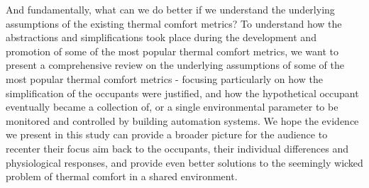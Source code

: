 And fundamentally, what can we do better if we understand the underlying assumptions of the existing thermal comfort metrics? To understand how the abstractions and simplifications took place during the development and promotion of some of the most popular thermal comfort metrics, we want to present a comprehensive review on the underlying assumptions of some of the most popular thermal comfort metrics - focusing particularly on how the simplification of the occupants were justified, and how the hypothetical occupant eventually became a collection of, or a single environmental parameter to be monitored and controlled by building automation systems. We hope the evidence we present in this study can provide a broader picture for the audience to recenter their focus aim back to the occupants, their individual differences and physiological responses, and provide even better solutions to the seemingly wicked problem of thermal comfort in a shared environment.
